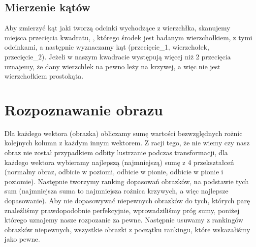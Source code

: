 \documentclass[a4paper,11pt]{article}
\begin{document}
\subsection{Mierzenie kątów}
Aby zmierzyć kąt jaki tworzą odcinki wychodzące z wierzchłka, skanujemy miejsca przecięcia kwadratu, , którego środek jest badanym wierzchołkiem, z tymi odcinkami, a następnie wyznaczamy kąt (przecięcie\_1, wierzchołek, przecięcie\_2). Jeżeli w naszym kwadracie występują więcej niż 2 przecięcia uznajemy, że dany wierzchłek na pewno leży na krzywej, a więc nie jest wierzchołkiem prostokąta.

\section{Rozpoznawanie obrazu}
Dla każdego wektora (obrazka) obliczamy sumę wartości bezwzględnych rożnic kolejnych kolumn z każdym innym wektorem. Z racji tego, że nie wiemy czy nasz obraz nie został przypadkiem odbity lustrzanie podczas transformacji, dla każdego wektora wybieramy najlepszą (najmniejszą) sumę z 4 przekształceń (normalny obraz, odbicie w poziomi, odbicie w pionie, odbicie w pionie i poziomie). Następnie tworzymy ranking dopasowań obrazków, na podstawie tych sum (najmniejsza suma to najmniejsza rożnica krzywych, a więc najlepsze dopasowanie). Aby nie dopasowywać niepewnych obrazków do tych, których parę znaleźliśmy prawdopodobnie perfekcyjnie, wprowadziliśmy próg sumy, poniżej którego uznajemy nasze rozpozanie za pewne. Następnie usuwamy z rankingów obrazków niepewnych, wszystkie obrazki z początku rankingu, które wskazałiśmy jako pewne.
\bigskip
\noindent
\end{document}
